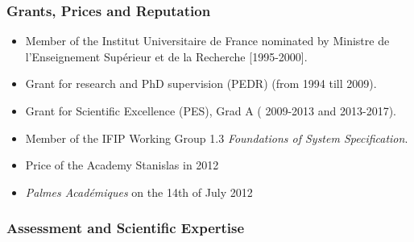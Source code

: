 \documentclass[ 12pt]{article}
\begin{document}
\subsubsection{Grants, Prices and Reputation}

\begin{itemize}
\item Member of the Institut Universitaire
de France nominated by   Ministre de l'Enseignement Sup\'erieur et de la Recherche [1995-2000].
\item  Grant for research and PhD supervision (PEDR) (from 1994  till  2009).
\item  Grant for Scientific Excellence (PES), Grad A  ( 2009-2013  and  2013-2017).
\item Member of the IFIP Working Group  1.3  \textit{Foundations of System Specification}.
\item Price of the Academy Stanislas in 2012

\item \textit{Palmes Acad\'emiques} on the  14th of  July  2012

\end{itemize}


\subsubsection{Assessment and Scientific Expertise} 
\end{document}
